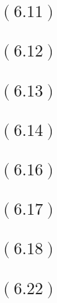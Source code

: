 \documentclass[letterpaper,12pt,titlepage]{article}
\begin{document}
\section*{$(6.11)$} 

\begin{mdframed}[style=MyFrame]
\end{mdframed}
\section*{$(6.12)$} 

\begin{mdframed}[style=MyFrame]
\end{mdframed}
\section*{$(6.13)$} 

\begin{mdframed}[style=MyFrame]
\end{mdframed}
\section*{$(6.14)$} 

\begin{mdframed}[style=MyFrame]
\end{mdframed}
\section*{$(6.16)$} 

\begin{mdframed}[style=MyFrame]
\end{mdframed}
\section*{$(6.17)$} 

\begin{mdframed}[style=MyFrame]
\end{mdframed}
\section*{$(6.18)$} 

\begin{mdframed}[style=MyFrame]
\end{mdframed}
\section*{$(6.22)$} 
\end{document}
